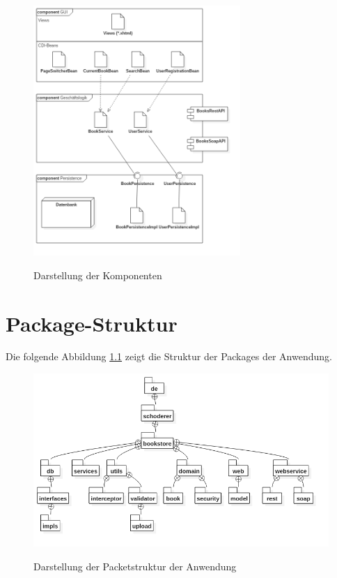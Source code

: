 \documentclass[12pt,a4paper]{book}
\begin{document}
		\begin{figure}[ht]
			\centering
			\includegraphics[width=0.70\textwidth]{Images/ComponentDiagram.png}
			\label{componentDiagramm}			
			\caption[Darstellung der Komponenten]{Darstellung der Komponenten}		
		\end{figure}
		\let\cleardoublepage\clearpage	
		\chapter{Package-Struktur}
		Die folgende Abbildung \ref{packageStructur} zeigt die Struktur der Packages der Anwendung.
		\vspace{1cm}		
		\begin{figure}[ht]
			\centering
			\includegraphics[width=1\textwidth]{Images/package.png}
			\label{packageStructur}			
			\caption[Packetstrukturdiagramm]{Darstellung der Packetstruktur der Anwendung}		
		\end{figure}\\
		
\end{document}
